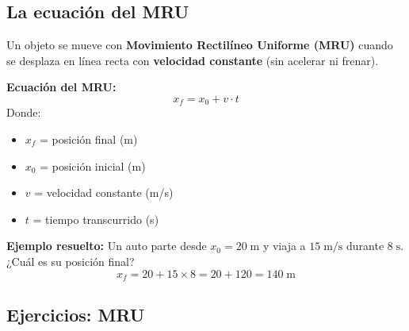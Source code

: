 \documentclass[12pt, letterpaper]{article}
\begin{document}
\subsection{La ecuación del MRU}

Un objeto se mueve con \textbf{Movimiento Rectilíneo Uniforme (MRU)} cuando se desplaza en línea recta con \textbf{velocidad constante} (sin acelerar ni frenar).

\begin{cuadroteoria}
  \textbf{Ecuación del MRU:}
  $$x_f = x_0 + v \cdot t$$
  Donde:
  \begin{itemize}[leftmargin=*]
    \item $x_f$ = posición final (m)
    \item $x_0$ = posición inicial (m)
    \item $v$ = velocidad constante (m/s)
    \item $t$ = tiempo transcurrido (s)
  \end{itemize}
\end{cuadroteoria}

\noindent\textbf{Ejemplo resuelto:} Un auto parte desde $x_0 = 20\;\text{m}$ y viaja a $15\;\text{m/s}$ durante $8\;\text{s}$. ¿Cuál es su posición final?
$$x_f = 20 + 15 \times 8 = 20 + 120 = 140\;\text{m}$$


\subsection{Ejercicios: MRU}
\end{document}
